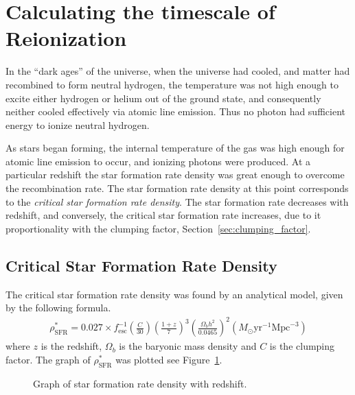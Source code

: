 
\newpage
\section{Calculating the timescale of Reionization} %
\label{sec:calculating_the_timescale_of_reionization}

	In the ``dark ages'' of the universe, when the universe had cooled, and matter had recombined to form neutral hydrogen, the temperature was not high enough to excite either hydrogen or helium out of the ground state, and consequently neither cooled effectively via atomic line emission. Thus no photon had sufficient energy to ionize neutral hydrogen.

	As stars began forming, the internal temperature of the gas was high enough for atomic line emission to occur, and ionizing photons were produced. At a particular redshift the star formation rate density was great enough to overcome the recombination rate. The star formation rate density at this point corresponds to the \emph{critical star formation rate density}. The star formation rate decreases with redshift, and conversely, the critical star formation rate increases, due to it proportionality with the clumping factor, Section~\ref{sec:clumping_factor}.

	\subsection{Critical Star Formation Rate Density} %
	\label{sub:critical_star_formation_rate_density}
		The critical star formation rate density was found by an analytical model, given by the following formula\cite{Pawlik:2009ij}.
		\begin{align}
			\rho^*_\text{SFR} = 0.027 \times f^{-1}_\text{esc} \left (\frac{C}{30} \right ) \left (\frac{1+z}{7} \right )^3 \left (\frac{\Omega_b h^2}{0.0465} \right )^2 (M_\odot \text{yr}^{-1} \text{Mpc}^{-3})
		\end{align}
		where $z$ is the redshift, $\Omega_b$ is the baryonic mass density and $C$ is the clumping factor. The graph of $\rho^*_\text{SFR}$ was plotted see Figure~\ref{fig:GRAPH_SFR_Density}.
		\begin{figure}[htbp]
			\centering
				\begingroup{}
					\resizebox{0.8\textwidth}{!}{%
						
					}\endgroup
			\caption{Graph of star formation rate density with redshift.\label{fig:GRAPH_SFR_Density}}
		\end{figure}

